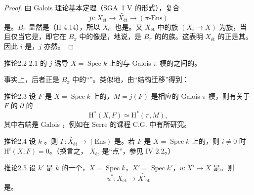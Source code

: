\begin{proof}
由 Galois 理论基本定理（SGA~1 V 的形式），复合
\[ji:X_{\text{ét}}\longrightarrow\widetilde{X_{\text{ét}}}\longrightarrow(\pi\text{-}\mathrm{Ens})\]
是。$B_\pi$ 显然是（II 4.14），所以 $X_{\text{ét}}$ 也是。又 $X_{\text{ét}}$ 中的族 $(X_i\to X)$ 为族，当且仅当它是，即它在 $B_\pi$ 中的像是，地说，是 $B_\pi$ 的的族。这表明 $X_{\text{ét}}$ 的正是其。因此 $i$ 是，$j$ 亦然。
\end{proof}
\begin{SGAresult}{推论}{2.2}
2.1 的 $j$ 诱导 $X=\operatorname{Spec}k$ 上的与 Galois $\pi$ 模的之间的。
\end{SGAresult}
事实上，后者正是 $B_\pi$ 中的“”。类似地，由“结构迁移”得到：
\begin{SGAresult}{推论}{2.3}
设 $F$ 是 $X=\operatorname{Spec}k$ 上的，$M=j(F)$ 是相应的 Galois $\pi$ 模，则有关于 $F$ 的 $\partial$ 的
\[\mathrm H^*(X,F)\simeq\mathrm H^*(\pi,M),\]
其中右端是 Galois ，例如在 Serre 的课程 C.G. 中有所研究。
\end{SGAresult}
\begin{SGAresult}{推论}{2.4}
设 $k$ 。则 $\Gamma:\widetilde{X_{\text{ét}}}\to(\mathrm{Ens})$ 是。若 $F$ 是 $X=\operatorname{Spec}k$ 上的，则 $i\ne0$ 时 $\mathrm H^i(X,F)=0$。（换言之， $\widetilde{X_{\text{ét}}}$ 是“点”，参见 IV 2.2。）
\end{SGAresult}
\begin{SGAresult}{推论}{2.5}
设 $k'$ 是 $k$ 的一个，$X=\operatorname{Spec}k$，$X'=\operatorname{Spec}k'$，$u:X'\to X$ 是。则
\[u^*:\widetilde{X_{\text{ét}}}\longrightarrow\widetilde{X'_{\text{ét}}}\]
是。
\end{SGAresult}

